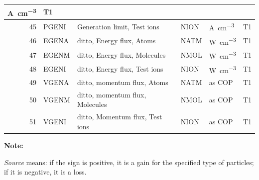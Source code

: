 \begin{landscape}
\begin{longtable}{|r|l|l|l|l|c|}
    \si{\ampere\per\cubic\centi\metre}       & T1
    \\ \hline
    45                                       & PGENI                            &
    Generation limit, Test ions              & NION                             &
    \si{\ampere\per\cubic\centi\metre}       & T1
    \\ \hline
    46                                       & EGENA                            & ditto,
    Energy flux, Atoms                       & NATM                             &
    \si{\watt\per\cubic\centi\metre}         & T1
    \\ \hline
    47                                       & EGENM                            & ditto,
    Energy flux, Molecules                   & NMOL
					     & \si{\watt\per\cubic\centi\metre} & T1
    \\ \hline
    48                                       & EGENI                            & ditto,
    Energy flux, Test ions                   & NION                             &
    \si{\watt\per\cubic\centi\metre}         & T1
    \\ \hline
    49                                       & VGENA                            & ditto,
    momentum flux, Atoms                     & NATM                             & as COP
					     & T1
    \\ \hline
    50                                       & VGENM                            & ditto,
    momentum flux, Molecules                 & NMOL                             & as
    COP                                      & T1
    \\ \hline
    51                                       & VGENI                            & ditto,
    Momentum flux, Test ions                 &
    NION                                     & as COP                           & T1
    \\ \hline
  \end{longtable}

  \textbf{Note:}

  \emph{Source} means: if the sign is positive, it is a
  gain for the specified type of particles; if it is negative, it is a loss.

  \newpage


\end{landscape}
